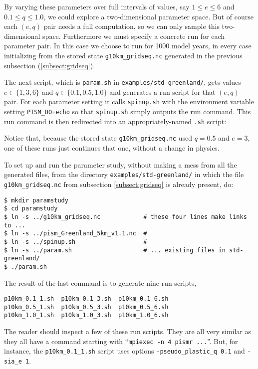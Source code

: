 By varying these parameters over full intervals of values, say $1 \le e \le 6$ and $0.1\le q \le 1.0$, we could explore a two-dimensional parameter space.  But of course each $(e,q)$ pair needs a full computation, so we can only sample this two-dimensional space.  Furthermore we must specify a concrete run for each parameter pair.  In this case we choose to run for 1000 model years, in every case initializing from the stored state \texttt{g10km_gridseq.nc} generated in the previous subsection (\ref{subsect:gridseq}).

The next script, which is \texttt{param.sh} in \texttt{examples/std-greenland/}, gets values $e\in\{1,3,6\}$ and $q\in\{0.1,0.5,1.0\}$ and generates a run-script for that $(e,q)$ pair.  For each parameter setting it calls \texttt{spinup.sh} with the environment variable setting \texttt{PISM_DO=echo} so that \texttt{spinup.sh} simply outputs the run command.  This run command is then redirected into an appropriately-named \texttt{.sh} script:
Notice that, because the stored state \texttt{g10km_gridseq.nc} used $q=0.5$ and $e=3$, one of these runs just continues that one, without a change in physics.

To set up and run the parameter study, without making a mess from all the generated files,  from the directory \texttt{examples/std-greenland/} in which the file \texttt{g10km_gridseq.nc} from subsection \ref{subsect:gridseq} is already present, do:
\small
\begin{verbatim}
$ mkdir paramstudy
$ cd paramstudy
$ ln -s ../g10km_gridseq.nc            # these four lines make links to ...
$ ln -s ../pism_Greenland_5km_v1.1.nc  #
$ ln -s ../spinup.sh                   #
$ ln -s ../param.sh                    # ... existing files in std-greenland/
$ ./param.sh
\end{verbatim}
\normalsize
The result of the last command is to generate nine run scripts,
\small
\begin{verbatim}
p10km_0.1_1.sh  p10km_0.1_3.sh  p10km_0.1_6.sh
p10km_0.5_1.sh  p10km_0.5_3.sh  p10km_0.5_6.sh
p10km_1.0_1.sh  p10km_1.0_3.sh  p10km_1.0_6.sh
\end{verbatim}
\normalsize
The reader should inspect a few of these run scripts.  They are all very similar as they all have a command starting with ``\texttt{mpiexec -n 4 pismr ...}''.  But, for instance, the \texttt{p10km_0.1_1.sh} script uses options \texttt{-pseudo_plastic_q 0.1} and \texttt{-sia_e 1}.


